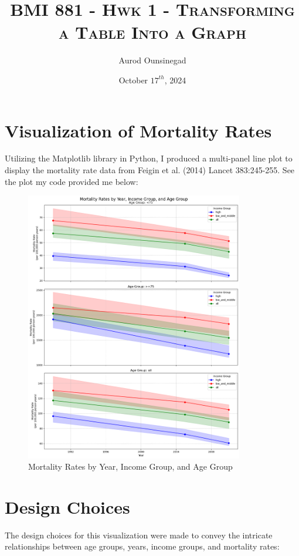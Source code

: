 \documentclass[a4paper]{article}
\title{\textsc{BMI 881 - Hwk 1 - Transforming a Table Into a Graph}} %
\author{
Aurod Ounsinegad \\
}
\date{October $17^{th}$, 2024}
\begin{document}
\maketitle

\section{Visualization of Mortality Rates}

Utilizing the Matplotlib library in Python, I produced a multi-panel line plot to display the mortality rate data from Feigin et al. (2014) Lancet 383:245-255. See the plot my code provided me below:

\begin{figure}[h!]
\centering
\includegraphics[width=0.85\textwidth]{HW1_table_to_graph_plot.png}
\caption{Mortality Rates by Year, Income Group, and Age Group}
\label{fig:mortality_rates}
\end{figure}

\section{Design Choices}

The design choices for this visualization were made to convey the intricate relationships between age groups, years, income groups, and mortality rates:
\end{document}
